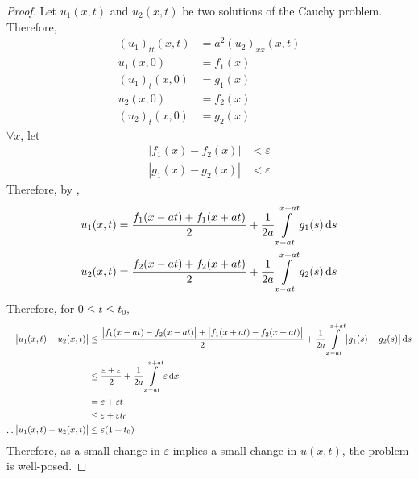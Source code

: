 \documentclass[titlepage, fleqn, a4paper, 12pt, twoside]{article}
\theoremstyle{definition}
\theoremstyle{theorem}
\begin{document}
\begin{proof}
	Let $u_1(x,t)$ and $u_2(x,t)$ be two solutions of the Cauchy problem.
	Therefore,
	\begin{align*}
		(u_1)_{t t}(x,t) & = a^2 (u_2)_{x x}(x,t) \\
		u_1(x,0)         & = f_1(x)               \\
		(u_1)_t(x,0)     & = g_1(x)               \\
		u_2(x,0)         & = f_2(x)               \\
		(u_2)_t(x,0)     & = g_2(x)
	\end{align*}
	$\forall x$, let
	\begin{align*}
		\left| f_1(x) - f_2(x) \right| & < \varepsilon \\
		\left| g_1(x) - g_2(x) \right| & < \varepsilon
	\end{align*}
	Therefore, by ,
	\begin{align*}
		u_1(x,t) & = \frac{f_1(x - a t) + f_1(x + a t)}{2} + \frac{1}{2 a} \int\limits_{x - a t}^{x + a t} g_1(s) \dif s \\
		u_2(x,t) & = \frac{f_2(x - a t) + f_2(x + a t)}{2} + \frac{1}{2 a} \int\limits_{x - a t}^{x + a t} g_2(s) \dif s
	\end{align*}
	Therefore, for $0 \le t \le t_0$,
	\begin{align*}
		\left| u_1(x,t) - u_2(x,t) \right|            & \le \frac{\left| f_1(x - a t) - f_2(x - a t) \right| + \left| f_1(x + a t) - f_2(x + a t) \right|}{2} + \frac{1}{2 a} \int\limits_{x - a t}^{x + a t} \left| g_1(s) - g_2(s) \right| \dif s \\
                                                              & \le \frac{\varepsilon + \varepsilon}{2} + \frac{1}{2 a} \int\limits_{x - a t}^{x + a t} \varepsilon \dif x                                                                                  \\
                                                              & = \varepsilon + \varepsilon t                                                                                                                                                               \\
                                                              & \le \varepsilon + \varepsilon t_0                                                                                                                                                           \\
		\therefore \left| u_1(x,t) - u_2(x,t) \right| & \le \varepsilon (1 + t_0)
	\end{align*}
	Therefore, as a small change in $\varepsilon$ implies a small change in $u(x,t)$, the problem is well-posed.
\end{proof}
\end{document}
